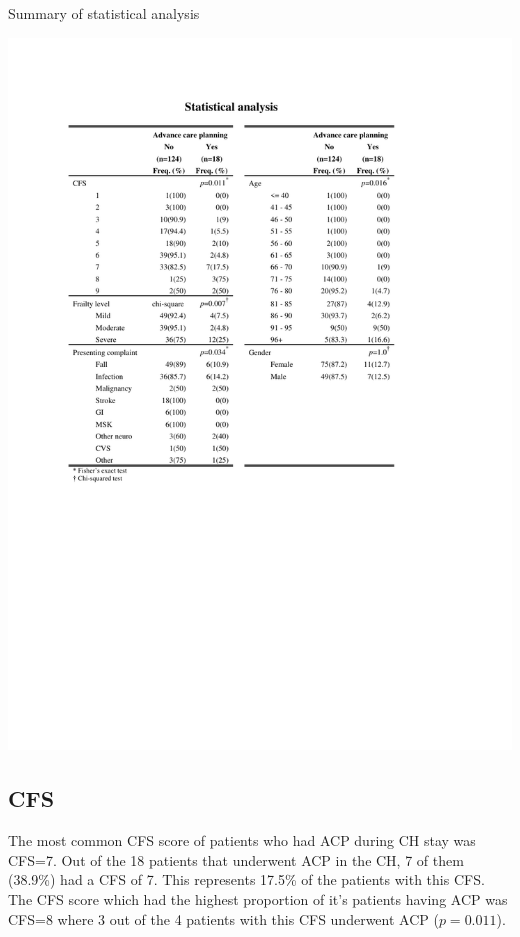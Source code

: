 \documentclass
[
	12pt,
	a4paper,
	oneside,
]{report}
\begin{document}
\begin{table}[ht]
\caption{Summary of statistical analysis}
\label{tab:statistics}
\includegraphics[width=\textwidth,
	trim={2.5cm 10cm 2.5cm 2.5cm},
	clip]{media/statistical-analysis}
\end{table}

\subsection{CFS}

The most common CFS score of patients 
who had ACP during CH stay was CFS=7. Out of the 18 patients that
underwent ACP in the CH, 7 of them (38.9\%) had a CFS of 7. This represents 
17.5\% of the patients with this CFS. The CFS score which had the highest 
proportion of it's patients having ACP was CFS=8 where 3 out of the 4 patients 
with this CFS underwent ACP ($p=0.011$). 
\end{document}

